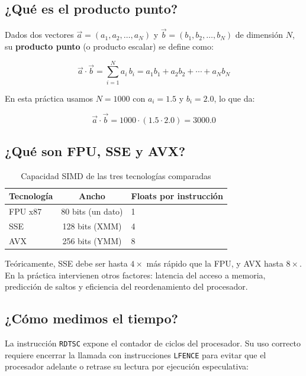 \documentclass[12pt, letterpaper]{article}
\begin{document}
\subsection*{¿Qué es el producto punto?}

Dados dos vectores $\vec{a} = (a_1, a_2, \ldots, a_N)$ y $\vec{b} = (b_1, b_2, \ldots, b_N)$ de dimensión $N$, su \textbf{producto punto} (o producto escalar) se define como:

\begin{equation}
    \vec{a} \cdot \vec{b} = \sum_{i=1}^{N} a_i \, b_i = a_1 b_1 + a_2 b_2 + \cdots + a_N b_N
\end{equation}

En esta práctica usamos $N = 1000$ con $a_i = 1.5$ y $b_i = 2.0$, lo que da:

\begin{equation}
    \vec{a} \cdot \vec{b} = 1000 \cdot (1.5 \cdot 2.0) = 3000.0
\end{equation}

\subsection*{¿Qué son FPU, SSE y AVX?}

\begin{table}[H]
    \centering
    \begin{tabular}{@{}lcl@{}}
        \toprule
        \textbf{Tecnología} & \textbf{Ancho} & \textbf{Floats por instrucción} \\
        \midrule
        FPU x87  & 80 bits (un dato)  & 1 \\
        SSE      & 128 bits (XMM)     & 4 \\
        AVX      & 256 bits (YMM)     & 8 \\
        \bottomrule
    \end{tabular}
    \caption{Capacidad SIMD de las tres tecnologías comparadas}
\end{table}

Teóricamente, SSE debe ser hasta $4\times$ más rápido que la FPU, y AVX hasta $8\times$. En la práctica intervienen otros factores: latencia del acceso a memoria, predicción de saltos y eficiencia del reordenamiento del procesador.

\subsection*{¿Cómo medimos el tiempo?}

La instrucción \texttt{RDTSC} expone el contador de ciclos del procesador. Su uso correcto requiere encerrar la llamada con instrucciones \texttt{LFENCE} para evitar que el procesador adelante o retrase su lectura por ejecución especulativa:
\end{document}
